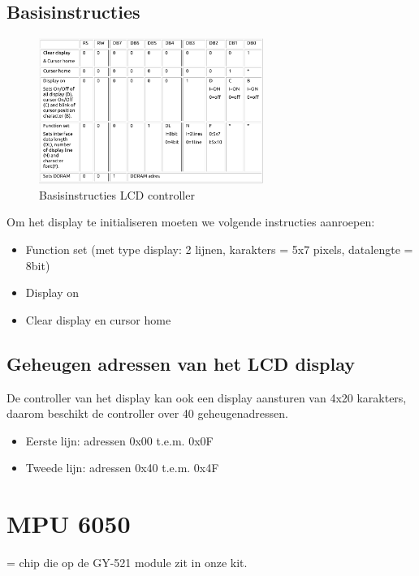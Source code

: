 \documentclass{article}
\begin{document}
\subsection{Basisinstructies}
\begin{figure}[H]
    \centering
    \includegraphics[width=0.65\textwidth]{lcd-instructies.png}
    \caption{Basisinstructies LCD controller}
\end{figure}

Om het display te initialiseren moeten we volgende instructies aanroepen:
\begin{itemize}
    \item Function set (met type display: 2 lijnen, karakters = 5x7 pixels, datalengte = 8bit)
    \item Display on
    \item Clear display en cursor home
\end{itemize}


\subsection{Geheugen adressen van het LCD display}
De controller van het display kan ook een display aansturen van 4x20 karakters, 
daarom beschikt de controller over 40 geheugenadressen. 

\begin{itemize}
    \item Eerste lijn: adressen 0x00 t.e.m. 0x0F
    \item Tweede lijn: adressen 0x40 t.e.m. 0x4F
\end{itemize}

\section{MPU 6050}

= chip die op de GY-521 module zit in onze kit. 
\end{document}
